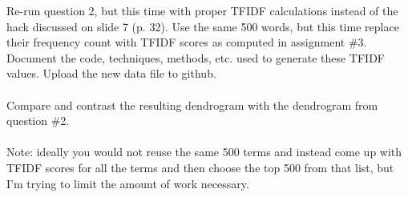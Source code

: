 Re-run question 2, but this time with proper TFIDF calculations instead of the hack discussed on slide 7 (p. 32).  Use the same 500 words, but this time replace their frequency count with TFIDF scores as computed in assignment \#3. Document the code, techniques, methods, etc. used to generate these TFIDF values.  Upload the new data file to github.\\
\\
Compare and contrast the resulting dendrogram with the dendrogram from question \#2.\\
\\
Note: ideally you would not reuse the same 500 terms and instead come up with TFIDF scores for all the terms and then choose the top 500 from that list, but I'm trying to limit the amount of work necessary.